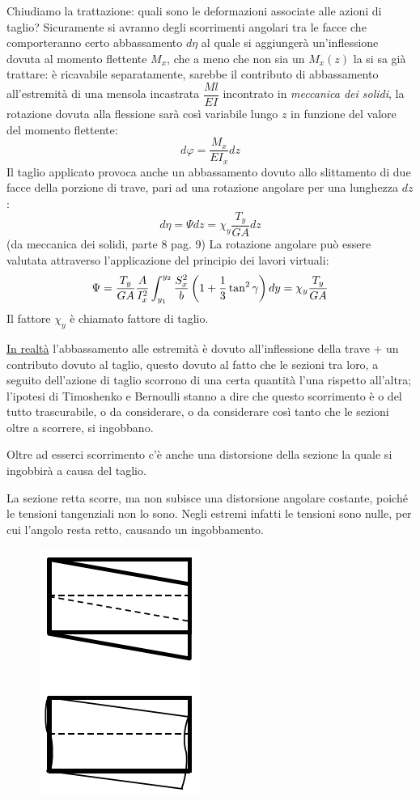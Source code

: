 		Chiudiamo la trattazione: quali sono le deformazioni associate alle azioni di taglio? Sicuramente si avranno degli scorrimenti angolari tra le facce che comporteranno certo abbassamento $d\eta$ al quale si aggiungerà un'inflessione dovuta al momento flettente $M_x$, che a meno che non sia un $M_x(z)$ la si sa già trattare: è ricavabile separatamente, sarebbe il contributo di abbassamento all'estremità di una mensola incastrata \(\dfrac{Ml}{EI}\) incontrato in \textit{meccanica dei solidi}, la rotazione dovuta alla flessione sarà così variabile lungo $ z $ in funzione del valore del momento flettente:
		\[ d\varphi = \dfrac{M_x}{EI_x}dz\]
		Il taglio applicato provoca anche un abbassamento dovuto allo slittamento di due facce della porzione di trave, pari ad una rotazione angolare per una lunghezza $dz$:
		\[d\eta = \Psi dz = \chi_y \dfrac{T_y}{GA}dz\]
		{\footnotesize (da meccanica dei solidi, parte 8 pag. 9)}\newline
		La rotazione angolare può essere valutata attraverso l'applicazione del principio dei lavori virtuali:
		\[ \Psi = \dfrac{T_y}{GA}\dfrac{A}{I_x^2}\int_{y_1}^{y_2}\dfrac{S_x^2}{b}\left(1 + {1\over 3}\tan^2\gamma\right)dy = \chi_y \dfrac{T_y}{GA} \] 
		Il fattore $\chi_y$ è chiamato fattore di taglio. \newline 
		
		\underline{In realtà} l'abbassamento alle estremità è dovuto all'inflessione della trave + un contributo dovuto al taglio, questo dovuto al fatto che le sezioni tra loro, a seguito dell'azione di taglio scorrono di una certa quantità l'una rispetto all'altra; l'ipotesi di Timoshenko e Bernoulli stanno a dire che questo scorrimento è o del tutto trascurabile, o da considerare, o da considerare così tanto che le sezioni oltre a scorrere, si ingobbano. \newline
		
		Oltre ad esserci scorrimento c'è anche una distorsione della sezione la quale si ingobbirà a causa del taglio.
		
		La sezione retta scorre, ma non subisce una distorsione angolare
		costante, poiché le tensioni tangenziali non lo sono. Negli estremi
		infatti le tensioni sono nulle, per cui l’angolo resta retto, causando
		un ingobbamento. 
		
\begin{figure}[H]
	\centering
	\includegraphics[width=0.15\linewidth]{immagini_6/screenshot008}
	\label{fig:screenshot008}
\end{figure}

